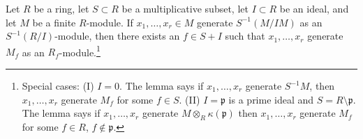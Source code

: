 \begin{lemma}
\label{editorial-source-lemma-NAK-localization}
Let $R$ be a ring, let $S \subset R$ be a multiplicative subset,
let $I \subset R$ be an ideal, and let $M$ be a finite $R$-module.
If $x_1, \ldots, x_r \in M$ generate $S^{-1}(M/IM)$
as an $S^{-1}(R/I)$-module, then there exists an $f \in S + I$
such that $x_1, \ldots, x_r$ generate $M_f$ as an
$R_f$-module.\footnote{Special cases: (I) $I = 0$. The lemma says
if $x_1, \ldots, x_r$ generate $S^{-1}M$, then $x_1, \ldots, x_r$
generate $M_f$ for some $f \in S$. (II) $I = \mathfrak p$ is
a prime ideal and $S = R \setminus \mathfrak p$. The lemma says if
$x_1, \ldots, x_r$ generate $M \otimes_R \kappa(\mathfrak p)$
then $x_1, \ldots, x_r$ generate $M_f$ for some
$f \in R$, $f \not \in \mathfrak p$.}
\end{lemma}


